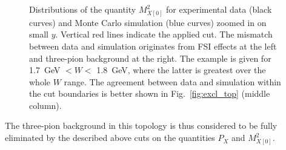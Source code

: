 \begin{figure}[!ht]
\begin{center}
\end{center}
\caption{\small Distributions of the quantity $M^{2}_{X[0]}$ for experimental data (black curves) and Monte Carlo simulation (blue curves) zoomed in on small $y$. Vertical red lines indicate the applied cut. The mismatch between data and simulation originates from FSI effects at the left and three-pion background at the right. The example is given for 1.7~GeV $< W <$ 1.8~GeV, where the latter is greatest over the whole $W$ range. The agreement between data and simulation within the cut boundaries is better shown in Fig.~\ref{fig:excl_top} (middle column).}
\label{fig:mm_0_zoomed}
\end{figure}



The three-pion background in this topology is thus considered to be fully eliminated by the described above cuts on the quantities $P_{X}$ and $M^{2}_{X[0]}$.



